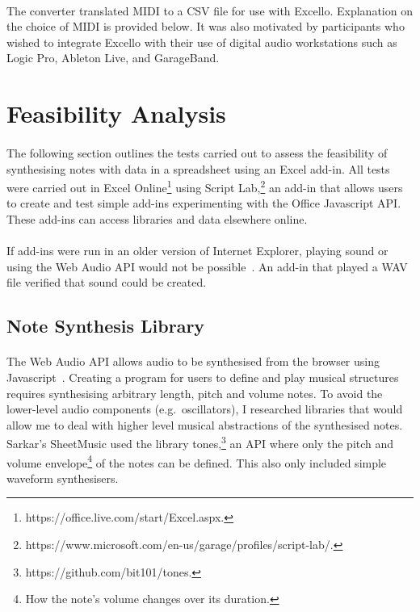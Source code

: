 \paragraph{} The converter translated MIDI to a CSV file for use with Excello. Explanation on the choice of MIDI is provided below. It was also motivated by participants who wished to integrate Excello with their use of digital audio workstations such as Logic Pro, Ableton Live, and GarageBand.

\section{Feasibility Analysis}

\paragraph{} The following section outlines the tests carried out to assess the feasibility of synthesising notes with data in a spreadsheet using an Excel add-in. All tests were carried out in Excel Online\footnote{https://office.live.com/start/Excel.aspx.} using Script Lab,\footnote{https://www.microsoft.com/en-us/garage/profiles/script-lab/.} an add-in that allows users to create and test simple add-ins experimenting with the Office Javascript API. These add-ins can access libraries and data elsewhere online.

\paragraph{} If add-ins were run in an older version of Internet Explorer, playing sound or using the Web Audio API would not be possible~\cite{mozilla:webaudioapi}. An add-in that played a WAV file verified that sound could be created.

\subsection{Note Synthesis Library}

\paragraph{} The Web Audio API allows audio to be synthesised from the browser using Javascript~\cite{mozilla:webaudioapi}. Creating a program for users to define and play musical structures requires synthesising arbitrary length, pitch and volume notes. To avoid the lower-level audio components (e.g.~oscillators), I researched libraries that would allow me to deal with higher level musical abstractions of the synthesised notes. Sarkar's SheetMusic used the library tones,\footnote{https://github.com/bit101/tones.} an API where only the pitch and volume envelope\footnote{How the note's volume changes over its duration.} of the notes can be defined. This also only included simple waveform synthesisers.

